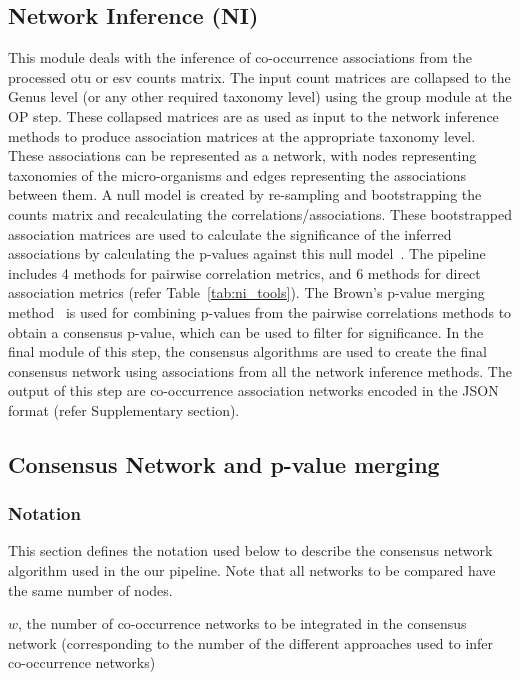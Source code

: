   \subsection*{Network Inference (NI)}
  \vspace{-5mm}
  This module deals with the inference of co-occurrence associations from the processed \ac{otu} or \ac{esv} counts matrix.
  The input count matrices are collapsed to the Genus level (or any other required taxonomy level) using the group module at the OP step.
  These collapsed matrices are as used as input to the network inference methods to produce association matrices at the appropriate taxonomy level.
  These associations can be represented as a network, with nodes representing taxonomies of the micro-organisms and edges representing the associations between them.
  A null model is created by re-sampling and bootstrapping the counts matrix and recalculating the correlations/associations.
  These bootstrapped association matrices are used to calculate the significance of the inferred associations by calculating the p-values against this null model~\cite{Watts2018}.
  The pipeline includes 4 methods for pairwise correlation metrics, and 6 methods for direct association metrics (refer Table~\ref{tab:ni_tools}).
  The Brown's p-value merging method~\cite{brown_400_1975} is used for combining p-values from the pairwise correlations methods to obtain a consensus p-value, which can be used to filter for significance.
  In the final module of this step, the consensus algorithms are used to create the final consensus network using associations from all the network inference methods.
  The output of this step are co-occurrence association networks encoded in the JSON format (refer Supplementary section).

  \subsection*{Consensus Network and p-value merging}
  \vspace{-5mm}

 \subsubsection*{Notation}

  This section defines the notation used below to describe the consensus network algorithm used in the our pipeline. Note that all networks to be compared have the same number of nodes.

  $w$, the number of co-occurrence networks to be integrated in the consensus network (corresponding to the number of the different approaches used to infer co-occurrence networks)

